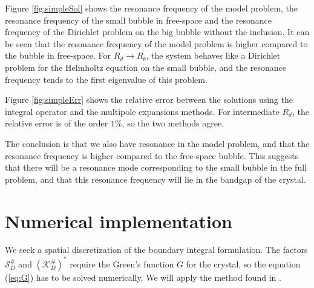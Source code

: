 \documentclass[a4paper]{article}
\theoremstyle{definition}
\newcommand{\Scrystal}{\mathcal{S}_D^\#}
\newcommand{\KstarC}{(\mathcal{K}_D^{\#})^*}
\newcommand{\eqnref}[1]{(\ref {#1})}
\begin{document}
Figure \ref{fig:simpleSol} shows the resonance frequency of the model problem, the resonance frequency of the small bubble in free-space and the resonance frequency of the Dirichlet problem on the big bubble without the inclusion. It can be seen that the resonance frequency of the model problem is higher compared to the bubble in free-space. For $R_d \rightarrow R_b$, the system behaves like a Dirichlet problem for the Helmholtz equation on the small bubble, and the resonance frequency tends to the first eigenvalue of this problem.

Figure \ref{fig:simpleErr} shows the relative error between the solutions using the integral operator and the multipole expansions methods. For intermediate $R_d$, the relative error is of the order $1\%$, so the two methods agree.

The conclusion is that we also have resonance in the model problem, and that the resonance frequency is higher compared to the free-space bubble. This suggests that there will be a resonance mode corresponding to the small bubble in the full problem, and that this resonance frequency will lie in the bandgap of the crystal.

\section{Numerical implementation}
We seek a spatial discretization of the boundary integral formulation. The factors $\Scrystal$ and $\KstarC$ require the Green's function $G$ for the crystal, so the equation \eqnref{eq:G} has to be solved numerically. We will apply the method found in \cite{bandgap}.
\end{document}
